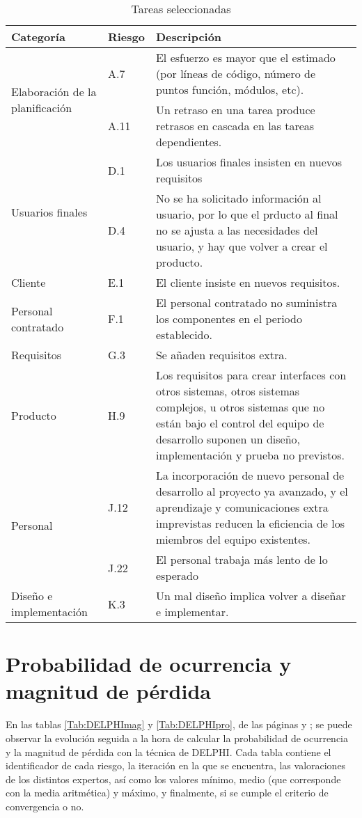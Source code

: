 \documentclass[11pt,a4paper,spanish,twoside]{report}
\begin{document}
\begin{table}[!ht]
  \centering
  \begin{tabular}{|p{3.5cm}||p{1.1cm}|p{6.3cm}|}
    \hline
    \textbf{Categoría} & \textbf{Riesgo} & \textbf{Descripción} \\
    \hline\hline
    \multirow{2}{3.5cm}{Elaboración de la planificación}
    & A.7 & El esfuerzo es mayor que el estimado (por líneas de código,
    número de puntos función, módulos, etc). \\  
    \cline{2-3}
    & A.11 & Un retraso en una tarea produce retrasos en cascada en las
    tareas dependientes. \\
    \hline
    \multirow{2}{3cm}{Usuarios finales}
    & D.1 & Los usuarios finales insisten en nuevos requisitos\\
    \cline{2-3}
    & D.4 & No se ha solicitado información al usuario, por lo que el prducto
    al final  no se ajusta a las necesidades del usuario, y hay que volver a
    crear el producto.\\
    \hline
    Cliente& E.1 & El cliente insiste en nuevos requisitos.\\
    \hline
    Personal contratado & F.1 & El personal contratado no suministra los
    componentes en el periodo establecido.\\
    \hline
    Requisitos& G.3 & Se añaden requisitos extra.\\
    \hline
    Producto & H.9 &  Los requisitos para crear interfaces con otros
    sistemas, otros sistemas complejos, u otros sistemas que no están bajo el
    control del equipo de desarrollo suponen un diseño, implementación y
    prueba no previstos.\\ 
    \hline
    \multirow{2}{3.5cm}{Personal}
    & J.12 & La incorporación de nuevo personal de desarrollo al proyecto ya
    avanzado, y el aprendizaje y comunicaciones extra imprevistas reducen la
    eficiencia de los miembros del equipo existentes.\\ 
    \cline{2-3}
    & J.22 & El personal trabaja más lento de lo esperado\\
    \hline
    \multirow{1}{3.5cm}{Diseño e implementación}
    & K.3 & Un mal diseño implica volver a diseñar e implementar.\\
   \hline
  \end{tabular}
  \caption{Tareas seleccionadas}
  \label{Tab:tar_sel}
\end{table}

\chapter{Probabilidad de ocurrencia y magnitud de pérdida} 
En las tablas \ref{Tab:DELPHImag} y \ref{Tab:DELPHIpro}, de las páginas
\pageref{Tab:DELPHImag} y \pageref{Tab:DELPHIpro}; se  
puede observar la evolución seguida a la hora de calcular la probabilidad de
ocurrencia y la magnitud de pérdida con la técnica de DELPHI. Cada tabla
contiene el identificador de cada riesgo, la iteración en 
la que se encuentra, las valoraciones de los distintos expertos, así como los
valores mínimo, medio (que
corresponde con la media aritmética) y máximo, y finalmente, si se cumple el
criterio de convergencia o no. 
\end{document}
